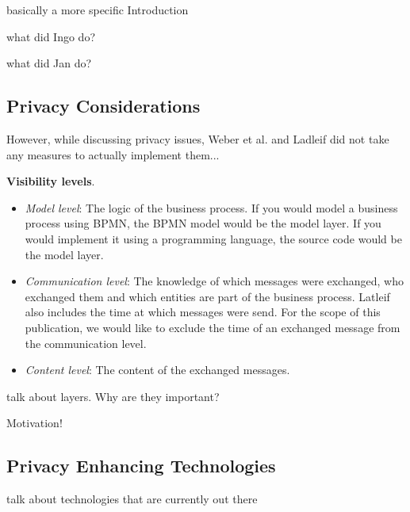 \documentclass[runningheads]{llncs}
\newcommand{\comment}[1]{}
\newcommand{\comment}[1]{}
\newcommand{\ber}[1]{\textit{#1}}
\begin{document}
basically a more specific Introduction

what did Ingo do?

what did Jan do?




\subsection{Privacy Considerations} \label{subsec:privacy}

However, while discussing privacy issues, Weber et al. and Ladleif did not take any measures to actually implement them...




\textbf{Visibility levels}. \cite{ladleif}
\comment{Our aim is to restrict the visibility of ACs and thus provide privacy for the participating entities in an untrusted business process. To structure our approach we would like to subdivide the visibility of ACs, an approach introduced by Ladleif in \cite{ladleif}.}

\begin{itemize}
    \item \ber{Model level}: The logic of the business process. If you would model a business process using BPMN, the BPMN model would be the model layer. If you would implement it using a programming language, the source code would be the model layer.
    \item \ber{Communication level}: The knowledge of which messages were exchanged, who exchanged them and which entities are part of the business process. Latleif also includes the time at which messages were send. For the scope of this publication, we would like to exclude the time of an exchanged message from the communication level.
    \item \ber{Content level}: The content of the exchanged messages.
\end{itemize}



talk about layers. Why are they important? 

Motivation!





\subsection{Privacy Enhancing Technologies} \label{subsec:technologies}

talk about technologies that are currently out there 
\end{document}

